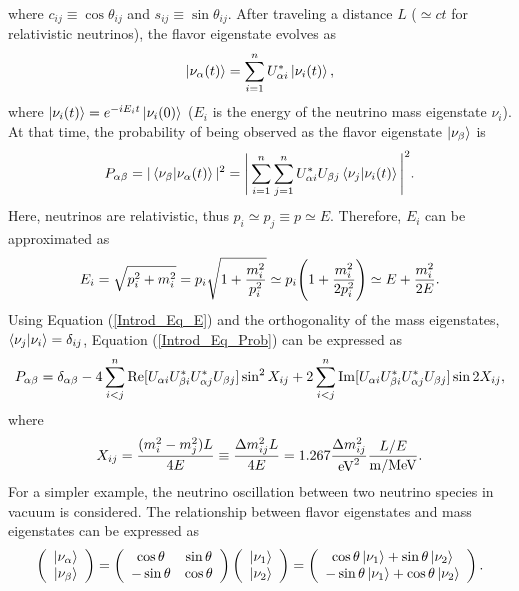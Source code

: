 where $c_{ij} \equiv \cos\theta_{ij}$ and $s_{ij} \equiv \sin\theta_{ij}$.
After traveling a distance $L$ ($\simeq ct$ for relativistic neutrinos), the flavor eigenstate evolves as
\begin{eqnarray}
	\ket{\nu_{\alpha}(t)} = \sum_{i=1}^{n} U_{\alpha i}^{*}\ket{\nu_{i}(t)},
\end{eqnarray}
where $\ket{\nu_{i}(t)} = e^{-iE_{i}t}\ket{\nu_{i}(0)}$ ($E_{i}$ is the energy of the neutrino mass eigenstate $\nu_{i}$).
At that time, the probability of being observed as the flavor eigenstate $\ket{\nu_{\beta}}$ is
\begin{eqnarray}\label{Introd_Eq_Prob}
	P_{\alpha\beta} = |\braket{\nu_{\beta}|\nu_{\alpha}(t)}|^{2} = \Bigg|\sum_{i=1}^{n}\sum_{j=1}^{n} U_{\alpha i}^{*}U_{\beta j}\braket{\nu_{j}|\nu_{i}(t)}\Bigg|^{2}.
\end{eqnarray}
Here, neutrinos are relativistic, thus $p_{i} \simeq p_{j} \equiv p \simeq E$. Therefore, $E_{i}$ can be approximated as
\begin{eqnarray}\label{Introd_Eq_E}
	E_{i} = \sqrt{p_{i}^{2}+m_{i}^{2}} = p_{i}\sqrt{1+{m_{i}^{2} \over p_{i}^{2}}} \simeq p_{i}\Bigg(1+{m_{i}^{2} \over 2p_{i}^{2}}\Bigg) \simeq E+{m_{i}^{2} \over 2E}.
\end{eqnarray}
Using Equation (\ref{Introd_Eq_E}) and the orthogonality of the mass eigenstates, $\braket{\nu_{j}|\nu_{i}} = \delta_{ij}$, Equation (\ref{Introd_Eq_Prob}) can be expressed as
\begin{eqnarray}
	P_{\alpha\beta} = \delta_{\alpha\beta}-4\sum_{i<j}^{n} {\rm Re}[U_{\alpha i}U_{\beta i}^{*}U_{\alpha j}^{*}U_{\beta j}]\sin^{2}X_{ij}+2\sum_{i<j}^{n} {\rm Im}[U_{\alpha i}U_{\beta i}^{*}U_{\alpha j}^{*}U_{\beta j}]\sin 2X_{ij},
\end{eqnarray}
where
\begin{eqnarray}\label{Introd_Eq_X}
	X_{ij} = {(m_{i}^{2}-m_{j}^{2})L \over 4E} \equiv {\Delta m_{ij}^{2}L \over 4E} = 1.267{\Delta m_{ij}^{2} \over {\rm eV}^{2}}{L/E \over {\rm m}/{\rm MeV}}.
\end{eqnarray}
\hs
For a simpler example, the neutrino oscillation between two neutrino species in vacuum is considered.
The relationship between flavor eigenstates and mass eigenstates can be expressed as
\begin{eqnarray}\label{Introd_Eq_FlavMass}
	\left(
	\begin{array}{c}
		\ket{\nu_{\alpha}} \\
		\ket{\nu_{\beta}}
	\end{array}
	\right)
	= \left(
	\begin{array}{cc}
		\cos\theta  & \sin\theta \\
		-\sin\theta & \cos\theta
	\end{array}
	\right)
	\left(
	\begin{array}{c}
		\ket{\nu_{1}} \\
		\ket{\nu_{2}}
	\end{array}
	\right)
	= \left(
	\begin{array}{c}
		\cos\theta\ket{\nu_{1}}+\sin\theta\ket{\nu_{2}} \\
		-\sin\theta\ket{\nu_{1}}+\cos\theta\ket{\nu_{2}}
	\end{array}
	\right).
\end{eqnarray}

